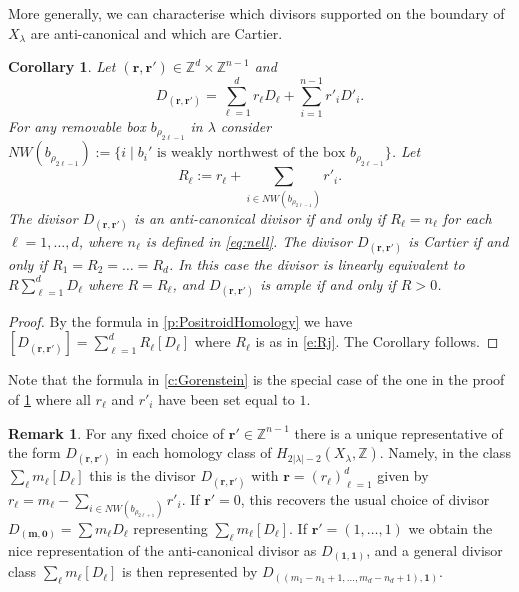 \documentclass{amsart}
\newtheorem{cor}[thm]{Corollary}
\theoremstyle{definition}
\newtheorem{remark}[thm]{Remark}
\numberwithin{equation}{section}
\newcommand{\Z}{\mathbb{Z}}
\begin{document}
More generally, we can characterise which divisors supported on the boundary of $X_\lambda$ are anti-canonical and which are Cartier.   
\begin{cor}\label{c:Drr} 
	Let $(\mathbf r,\mathbf r')\in \Z^{d}\times \Z^{n-1}$ and 
\[
D_{(\mathbf r,\mathbf r')}=\sum_{\ell=1}^{d} r_\ell D_\ell+\sum_{i=1}^{n-1} r'_i D'_i.
\]
For any removable box $b_{\rho_{2\ell-1}}$ in $\lambda$ consider  
$NW(b_{\rho_{2\ell-1}}):=\{i\mid \text {$b_i'$ is weakly northwest of the box $b_{\rho_{2\ell-1}}$}\}$. 
Let 
\begin{equation}\label{e:Rj}
R_\ell:=r_\ell+\sum_{i\in NW(b_{\rho_{2\ell-1}})}r'_i. 
\end{equation}
The divisor
	$D_{(\mathbf r,\mathbf r')}$ is an anti-canonical divisor if and only if $R_\ell=n_\ell$ for each $\ell=1,\dotsc, d$, where $n_{\ell}$
	is defined in \eqref{eq:nell}.
The divisor $D_{(\mathbf r,\mathbf r')}$ is Cartier if and only if $R_1=R_2=\dotsc=R_d$. In this case the divisor is linearly equivalent to $R\sum_{\ell=1}^d D_\ell$ where $R=R_\ell$, and $D_{(\mathbf r,\mathbf r')}$ is ample if and only if $R>0$.
\end{cor}

\begin{proof} By the formula in \cref{p:PositroidHomology} we have $[D_{(\mathbf r,\mathbf r')}]=\sum_{\ell=1}^d R_\ell[D_\ell]$ where $R_\ell$ is as in \eqref{e:Rj}. The Corollary follows.
\end{proof}

 Note that the formula in \cref{c:Gorenstein} is the special case of the one in the proof of \cref{c:Drr} where all $r_\ell$ and $r'_i$ have been set equal to $1$.
 
\begin{remark}\label{r:representative} For any fixed choice of $\mathbf r'\in\Z^{n-1}$ there is a unique representative of the form $D_{(\mathbf r,\mathbf r')}$ in each homology class of $H_{2|\lambda|-2}(X_\lambda,\Z)$. Namely, in the class $\sum_\ell m_\ell[ D_\ell]$ this is the divisor $D_{(\mathbf r,\mathbf r')}$ with 
$\mathbf r=(r_\ell)_{\ell=1}^d$ given by $r_\ell=m_\ell-\sum_{i\in NW(b_{\rho_{2\ell+1}})}r'_i$. If $\mathbf r'=0$, this recovers the usual choice of divisor $D_{(\mathbf m,\mathbf 0)}=\sum m_\ell D_\ell$ representing $\sum_\ell m_\ell[ D_\ell]$. If $\mathbf r'=(1,\dotsc,1)$ we obtain the nice representation of the anti-canonical divisor as $D_{(\mathbf 1,\mathbf 1)}$, and a general divisor class $\sum_\ell m_\ell [D_\ell]$ is  then represented by $D_{((m_1-n_1+1,\dotsc, m_d-n_d+1),\mathbf 1)}$. 
\end{remark}
\end{document}
